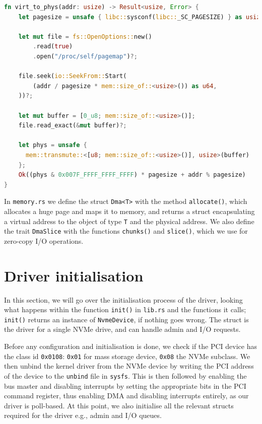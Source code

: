 \begin{lstlisting}[float, language=Rust, label=lst:virt_phys,caption=Translating a virtual address to its physical address]
fn virt_to_phys(addr: usize) -> Result<usize, Error> {
    let pagesize = unsafe { libc::sysconf(libc::_SC_PAGESIZE) } as usize;

    let mut file = fs::OpenOptions::new()
        .read(true)
        .open("/proc/self/pagemap")?;

    file.seek(io::SeekFrom::Start(
        (addr / pagesize * mem::size_of::<usize>()) as u64,
    ))?;

    let mut buffer = [0_u8; mem::size_of::<usize>()];
    file.read_exact(&mut buffer)?;

    let phys = unsafe {
      mem::transmute::<[u8; mem::size_of::<usize>()], usize>(buffer)
    };
    Ok((phys & 0x007F_FFFF_FFFF_FFFF) * pagesize + addr % pagesize)
}
\end{lstlisting}

In \texttt{memory.rs} we define the struct \texttt{Dma<T>} with the method \texttt{allocate()}, which allocates a huge page and maps it to memory, and returns a struct encapsulating a virtual address to the object of type \texttt{T} and the physical address. We also define the trait \texttt{DmaSlice} with the functions \texttt{chunks()} and \texttt{slice()}, which we use for zero-copy I/O operations.


\section{Driver initialisation}
In this section, we will go over the initialisation process of the driver, looking what happens within the function \texttt{init()} in \texttt{lib.rs} and the functions it calls; \texttt{init()} returns an instance of \texttt{NvmeDevice}, if nothing goes wrong. The struct is the driver for a single NVMe drive, and can handle admin and I/O requests.

Before any configuration and initialisation is done, we check if the PCI device has the class id \texttt{0x0108}: \texttt{0x01} for mass storage device, \texttt{0x08} the NVMe subclass.
We then unbind the kernel driver from the NVMe device by writing the PCI address of the device to the \texttt{unbind} file in \texttt{sysfs}. This is then followed by enabling the bus master and disabling interrupts by setting the appropriate bits in the PCI command register, thus enabling DMA and disabling interrupts entirely, as our driver is poll-based. At this point, we also initialise all the relevant structs required for the driver e.g., admin and I/O queues.

